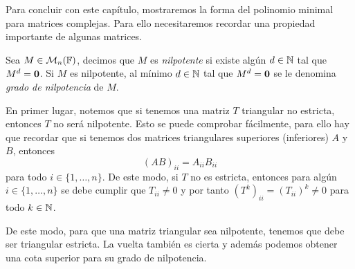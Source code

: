 Para concluir con este capítulo, mostraremos la forma del polinomio minimal para matrices complejas. Para ello necesitaremos recordar una propiedad importante de algunas matrices.

\begin{defi}
  Sea $M \in \mathcal{M}_n(\mathbb{F})$, decimos que $M$ es \emph{nilpotente} si existe algún $d\in\mathbb{N}$ tal que $M^d = \mathbf{0}$. Si $M$ es nilpotente, al mínimo $d \in \mathbb{N}$ tal que $M^d = \mathbf{0}$ se le denomina \emph{grado de nilpotencia} de $M$.
\end{defi}

En primer lugar, notemos que si tenemos una matriz $T$ triangular no estricta, entonces $T$ no será nilpotente. Esto se puede comprobar fácilmente, para ello hay que recordar que si tenemos dos matrices triangulares superiores (inferiores) $A$ y $B$, entonces
  \[
    (AB)_{ii} = A_{ii} B_{ii}
  \]
para todo $i \in \{1,\ldots,n\}$. De este modo, si $T$ no es estricta, entonces para algún $i \in \{1,\ldots,n\}$ se debe cumplir que $T_{ii} \neq 0$ y por tanto $(T^k)_{ii} = (T_{ii})^k \neq 0$ para todo $k \in \mathbb{N}$.

De este modo, para que una matriz triangular sea nilpotente, tenemos que debe ser triangular estricta. La vuelta también es cierta y además podemos obtener una cota superior para su grado de nilpotencia.

